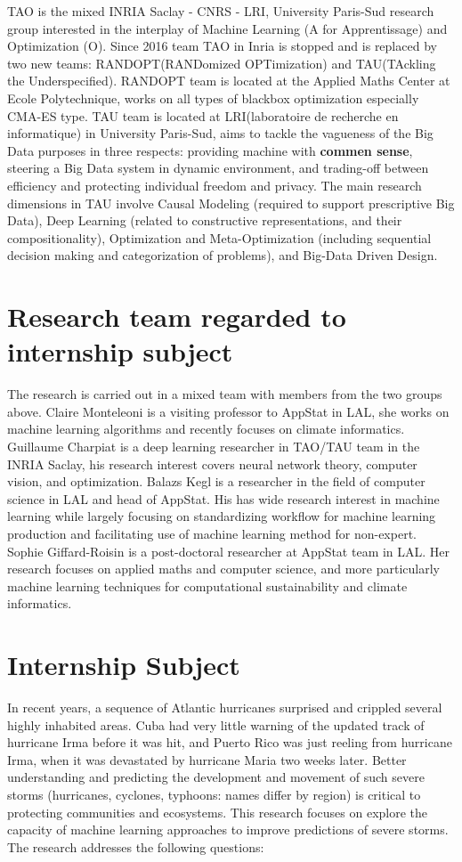 TAO is the mixed INRIA Saclay - CNRS - LRI, University Paris-Sud research group interested in the interplay of Machine Learning (A for Apprentissage) and Optimization (O). Since 2016 team TAO in Inria is stopped and is replaced by two new teams: RANDOPT(RANDomized OPTimization) and TAU(TAckling the Underspecified). RANDOPT team is located at the Applied Maths Center at Ecole Polytechnique, works on all types of blackbox optimization especially CMA-ES type. TAU team is located at LRI(laboratoire de recherche en informatique) in University Paris-Sud, aims to tackle the vagueness of the Big Data purposes\cite{TAO} in three respects: providing machine with \textbf{commen sense}, steering a Big Data system in dynamic environment, and trading-off between efficiency and protecting individual freedom and privacy\cite{TAU}. The main research dimensions in TAU involve Causal Modeling (required to support prescriptive Big Data), Deep Learning (related to constructive representations, and their compositionality), Optimization and Meta-Optimization (including sequential decision making and categorization of problems), and Big-Data Driven Design.


\section{Research team regarded to internship subject}
The research is carried out in a mixed team with members from the two groups above. Claire Monteleoni is a visiting professor to AppStat in LAL, she works on machine learning algorithms and recently focuses on climate informatics. Guillaume Charpiat is a deep learning researcher in TAO/TAU team in the INRIA Saclay, his research interest covers neural network theory, computer vision, and optimization. Balazs Kegl is a researcher in the field of computer science in LAL and head of AppStat. His has wide research interest in machine learning while largely focusing on standardizing workflow for machine learning production and facilitating use of machine learning method for non-expert. Sophie Giffard-Roisin is a post-doctoral researcher at AppStat team in LAL. Her research focuses on applied maths and computer science, and more particularly machine learning techniques for computational sustainability and climate informatics.  


\section{Internship Subject}
\label{sec:subject}
In recent years, a sequence of Atlantic hurricanes surprised and crippled several highly
inhabited areas. Cuba had very little warning of the updated track of hurricane Irma before it
was hit\cite{NYT}, and Puerto Rico was just reeling from hurricane Irma, when it was devastated by hurricane Maria two weeks later. Better understanding and predicting the development and
movement of such severe storms (hurricanes, cyclones, typhoons: names differ by region) is
critical to protecting communities and ecosystems. This research focuses on explore the capacity of machine learning approaches to improve predictions of severe storms. The research addresses the following questions:


